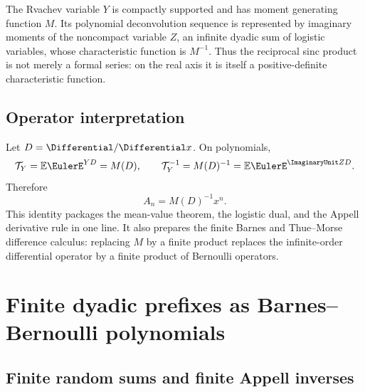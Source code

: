 \documentclass[11pt,oneside]{article}
\numberwithin{equation}{section}
\theoremstyle{definition}
\theoremstyle{remark}
\begin{document}
\begin{resultbox}
The Rvachev variable $Y$ is compactly supported and has moment generating function $M$.  Its
polynomial deconvolution sequence is represented by imaginary moments of the noncompact variable
$Z$, an infinite dyadic sum of logistic variables, whose characteristic function is $M^{-1}$.
Thus the reciprocal sinc product is not merely a formal series: on the real axis it is itself a
positive-definite characteristic function.
\end{resultbox}

\subsection{Operator interpretation}

Let $D=\Differential/\Differential x$.  On polynomials,
\begin{equation}
 \mathcal T_Y=\mathbb E\EulerE^{YD}=M(D),
 \qquad
 \mathcal T_Y^{-1}=M(D)^{-1}=\mathbb E\EulerE^{\ImaginaryUnit ZD}.
 \label{p2:eq:operator-deconvolution}
\end{equation}
Therefore
\begin{equation}
 A_n=M(D)^{-1}x^n.
 \label{p2:eq:A-operator}
\end{equation}
This identity packages the mean-value theorem, the logistic dual, and the Appell derivative rule in
one line.  It also prepares the finite Barnes and Thue--Morse difference calculus: replacing $M$ by
a finite product replaces the infinite-order differential operator by a finite product of Bernoulli
operators.

\section{Finite dyadic prefixes as Barnes--Bernoulli polynomials}
\label{p2:sec:barnes}

\subsection{Finite random sums and finite Appell inverses}
\end{document}
